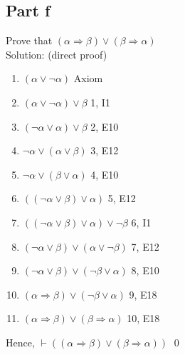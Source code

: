 \documentclass{article}
\begin{document}
		\subsection{Part f}
			Prove that $(\alpha \Rightarrow \beta) \lor (\beta \Rightarrow \alpha)$ \\
			Solution: (direct proof) \\
			\begin{enumerate}
				\item $(\alpha \lor \lnot\alpha)$ 									\hfill Axiom
				\item $(\alpha \lor \lnot\alpha) \lor \beta$    					\hfill 1, I1 
				\item $(\lnot\alpha \lor \alpha) \lor \beta$  						\hfill 2, E10 
				\item $\lnot\alpha \lor (\alpha \lor \beta)$  						\hfill 3, E12 
				\item $\lnot\alpha \lor (\beta \lor \alpha)$                    	\hfill 4, E10 
				\item $((\lnot\alpha \lor \beta) \lor \alpha)$                     	\hfill 5, E12
				\item $((\lnot\alpha \lor \beta) \lor \alpha) \lor \lnot\beta$     \hfill 6, I1
				\item $(\lnot\alpha \lor \beta) \lor (\alpha \lor \lnot\beta )$   	\hfill 7, E12
				\item $(\lnot\alpha \lor \beta) \lor (\lnot\beta \lor \alpha)$		\hfill 8, E10
				\item $(\alpha \Rightarrow \beta) \lor (\lnot\beta \lor \alpha)$	\hfill 9, E18
				\item $(\alpha \Rightarrow \beta) \lor (\beta \Rightarrow \alpha)$	\hfill 10, E18
			\end{enumerate}
			Hence, $\vdash $$((\alpha \Rightarrow \beta) \lor (\beta \Rightarrow \alpha))$ \hfill \qed
\end{document}
